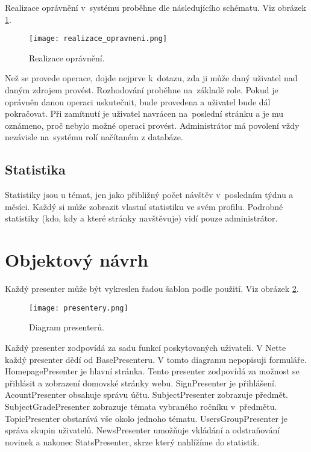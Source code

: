 \documentclass[thesis=B,czech]{FITthesis}[2012/06/26]
\begin{document}
Realizace oprávnění v~systému proběhne dle následujícího schématu. Viz obrázek \ref{fig:permission}.

\begin{figure}
  \centering
	\texttt{[image: realizace\_opravneni.png]}
	\caption{Realizace oprávnění.} \label{fig:permission} 
\end{figure}

Než se provede operace, dojde nejprve k~dotazu, zda ji může daný uživatel nad daným zdrojem provést. Rozhodování proběhne na~základě role. Pokud je oprávněn danou operaci uskutečnit, bude provedena a uživatel bude dál pokračovat. Při zamítnutí je uživatel navrácen na~poslední stránku a je mu oznámeno, proč nebylo možné operaci provést. Administrátor má povolení vždy nezávisle na~systému rolí načítaném z databáze.

\subsection{Statistika}

Statistiky jsou u témat, jen jako přibližný počet návštěv v~posledním týdnu a měsíci. Každý si může zobrazit vlastní statistiku ve svém profilu. Podrobné statistiky (kdo, kdy a které stránky navštěvuje) vidí pouze administrátor.


\section{Objektový návrh}
Každý presenter může být vykreslen řadou šablon podle použití. Viz obrázek \ref{fig:presentery}.

\begin{figure}
  \centering
	\texttt{[image: presentery.png]}
	\caption{Diagram presenterů.} \label{fig:presentery} 
\end{figure}

Každý presenter zodpovídá za sadu funkcí poskytovaných uživateli. V Nette každý presenter dědí od BasePresenteru. V tomto diagramu nepopisuji formuláře. HomepagePresenter je hlavní stránka. Tento presenter zodpovídá za možnost se přihlásit a zobrazení domovské stránky webu. SignPresenter je přihlášení. AcountPresenter obsahuje správu účtu. SubjectPresenter zobrazuje předmět. SubjectGradePresenter zobrazuje témata vybraného ročníku v~předmětu. TopicPresenter obstarává vše okolo jednoho tématu. UsersGroupPresenter je správa skupin uživatelů. NewsPresenter umožňuje vkládání a odstraňování novinek a nakonec StatsPresenter, skrze který nahlížíme do statistik.
\end{document}
